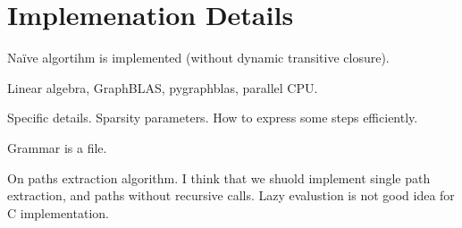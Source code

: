 \section{Implemenation Details}

Na{\"i}ve algortihm is implemented (without dynamic transitive closure).

Linear algebra, GraphBLAS, pygraphblas, parallel CPU.

Specific details. Sparsity parameters. How to express some steps efficiently.

Grammar is a file.

On paths extraction algorithm. I think that we shuold implement single path extraction, and paths without recursive calls. Lazy evalustion is not good idea for C implementation.